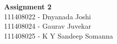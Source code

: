 \documentclass[main.tex]{subfiles}
\begin{document}
\begin{titlepage}

\begin{center}
  \LARGE{\bf{Assignment 2\\}}
  \horrule{0.4pt}
  111408022 - Dnyanada Joshi \\
  111408024 - Gaurav Juvekar \\
  111408025 - K Y Sandeep Somanna \\
\end{center}
\horrule{0.4pt}
\end{titlepage}
\end{document}
